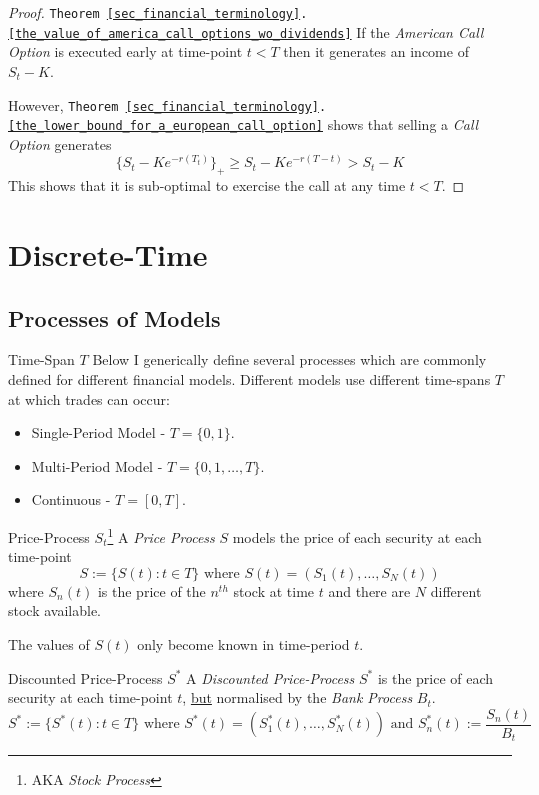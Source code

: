 \documentclass[11pt,a4paper]{article}
\begin{document}
  \begin{proof}{\texttt{Theorem \ref{sec_financial_terminology}.\ref{the_value_of_america_call_options_wo_dividends}}}
    If the \textit{American Call Option} is executed early at time-point $t<T$ then it generates an income of $S_t-K$.
    \par However, \texttt{Theorem \ref{sec_financial_terminology}.\ref{the_lower_bound_for_a_european_call_option}} shows that selling a \textit{Call Option} generates
    \[ \{S_t-Ke^{-r(T_t)}\}_+\geq S_t-Ke^{-r(T-t)}>S_t-K \]
    This shows that it is sub-optimal to exercise the call at any time $t<T$.
  \end{proof}

\section{Discrete-Time}\label{sec_discrete_time_models}

\subsection{Processes of Models}

  \begin{remark}{Time-Span $T$}
    Below I generically define several processes which are commonly defined for different financial models. Different models use different time-spans $T$ at which trades can occur:
    \begin{itemize}
      \item Single-Period Model - $T=\{0,1\}$.
      \item Multi-Period Model - $T=\{0,1,\dots,T\}$.
      \item Continuous - $T=[0,T]$.
    \end{itemize}
  \end{remark}

  \begin{definition}{Price-Process $S_t$\footnote{AKA \textit{Stock Process}}}\label{def_price_process}
    A \textit{Price Process} $S$ models the price of each security at each time-point
    \[ S:=\{S(t):t\in T\}\text{ where }S(t)=(S_1(t),\dots,S_N(t)) \]
    where $S_n(t)$ is the price of the $n^{th}$ stock at time $t$ and there are $N$ different stock available.
    \par The values of $S(t)$ only become known in time-period $t$.
  \end{definition}

  \begin{definition}{Discounted Price-Process $S^*$}\label{def_discounted_price_process}
    A \textit{Discounted Price-Process} $S^*$ is the price of each security at each time-point $t$, \underline{but} normalised by the \textit{Bank Process} $B_t$.
    \[ S^*:=\{S^*(t):t\in T\}\text{ where }S^*(t)=(S_1^*(t),\dots,S_N^*(t))\text{ and }S_n^*(t):=\frac{S_n(t)}{B_t} \]
  \end{definition}
\end{document}
